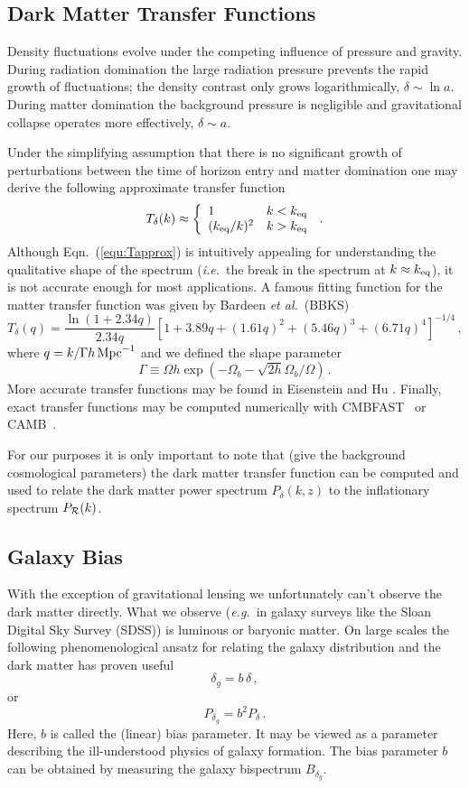 \documentclass[12pt,letterpaper,rotate]{article}
\def\beq{\begin{equation}}
\def\eeq{\end{equation}}
\begin{document}
{\subsection{Dark Matter Transfer Functions}
\label{sec:T}


Density fluctuations evolve under the competing influence of pressure and gravity.
During radiation domination the large radiation pressure prevents the rapid growth of fluctuations; the density contrast only grows logarithmically, $\delta \sim \ln a$.
During matter domination the background pressure is negligible and gravitational collapse operates more effectively, $\delta \sim a$.

Under the simplifying assumption that there is no significant growth of perturbations between the time of horizon entry and matter domination one may derive the following approximate transfer function
\beq
\label{equ:Tapprox}
T_\delta(k) \approx \left\{ \begin{array}{l l} 1 & k < k_{\rm eq} \\ (k_{\rm eq}/k)^2 & k > k_{\rm eq} \end{array} \right. \, .
\eeq
Although Eqn.~(\ref{equ:Tapprox}) is intuitively appealing for understanding the qualitative shape of the spectrum
({\it i.e.}~the break in the spectrum at $k \approx k_{\rm eq}$), it is not accurate enough for most applications.
A famous fitting function for the matter transfer function was given by Bardeen {\it et al.}~(BBKS) \cite{BBKS}
\beq
T_\delta(q) = \frac{\ln(1+2.34 q)}{2.34 q} \left[ 1+ 3.89 q +(1.61 q)^2 +(5.46 q)^3 + (6.71 q)^4\right]^{-1/4}\, ,
\eeq
where $q=k/\Gamma h\, {\rm Mpc}^{-1}$ and we defined the shape parameter
\beq
\Gamma \equiv \Omega h \exp (-\Omega_b - \sqrt{2h} \Omega_b/\Omega)\, .
\eeq
More accurate transfer functions may be found in
Eisenstein and Hu \cite{EisensteinHu}.
Finally, exact transfer functions may be computed numerically with 
{\sf CMBFAST}~\cite{CMBFAST} or {\sf CAMB}~\cite{CAMB}.

For our purposes it is only important to note that (give the background cosmological parameters) the dark matter transfer function can be computed and used to relate the dark matter power spectrum $P_\delta(k,z)$ to the inflationary spectrum $P_{\cal R}(k)$.

\subsection{Galaxy Bias}

With the exception of gravitational lensing we unfortunately can't observe the dark matter directly.
What we observe ({\it e.g.}~in galaxy surveys like the Sloan Digital Sky Survey (SDSS)) is luminous or baryonic matter.
On large scales the following phenomenological ansatz for relating the galaxy distribution and the dark matter has proven useful
\beq
\delta_g = b\, \delta\, ,
\eeq
or
\beq
P_{\delta_g} = b^2 P_\delta\, .
\eeq
Here, $b$ is called the (linear) bias parameter. It may be viewed as a parameter describing the ill-understood physics of galaxy formation. 
The bias parameter $b$ can be obtained by measuring the galaxy bispectrum $B_{\delta_g}$.

}
\end{document}
